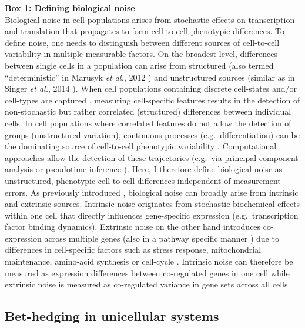 \begin{Comment}
\textbf{Box 1: Defining biological noise}\\
\small
Biological noise in cell populations arises from stochastic effects on transcription and translation that propagates to form cell-to-cell phenotypic differences. To define noise, one needs to distinguish between different sources of cell-to-cell variability in multiple measurable factors. On the broadest level, differences between single cells in a population can arise from structured (also termed “deterministic” in Marusyk \emph{et al.}, 2012 \citep{Marusyk2012}) and unstructured sources (similar as in Singer \emph{et al.}, 2014 \citep{Singer2014}). When cell populations containing discrete cell-states and/or cell-types are captured \citep{Paul2015, Ibarra-Soria2018, Rosenberg2018}, measuring cell-specific features results in the detection of non-stochastic but rather correlated (structured) differences between individual cells. In cell populations where correlated features do not allow the detection of groups (unstructured variation), continuous processes (e.g.~differentiation) can be the dominating source of cell-to-cell phenotypic variability \citep{Dahlin2018}. Computational approaches allow the detection of these trajectories (e.g.~via principal component analysis or pseudotime inference \citep{Trapnell2014, Angerer2015}). Here, I therefore define biological noise as unstructured, phenotypic cell-to-cell differences independent of measurement errors. 
As previously introduced \citep{Elowitz2002}, biological noise can broadly arise from intrinsic and extrinsic sources. Intrinsic noise originates from stochastic biochemical effects within one cell that directly influences gene-specific expression \citep{Swain2002} (e.g.~transcription factor binding dynamics). Extrinsic noise on the other hand introduces co-expression across multiple genes (also in a pathway specific manner \citep{Raser2010}) due to differences in cell-specific factors such as stress response, mitochondrial maintenance, amino-acid synthesis \citep{Stewart-Ornstein2012} or cell-cycle \citep{Zopf2013}. Intrinsic noise can therefore be measured as expression differences between co-regulated genes in one cell while extrinsic noise is measured as co-regulated variance in gene sets across all cells.\\
\end{Comment}

\subsection{Bet-hedging in unicellular systems}

